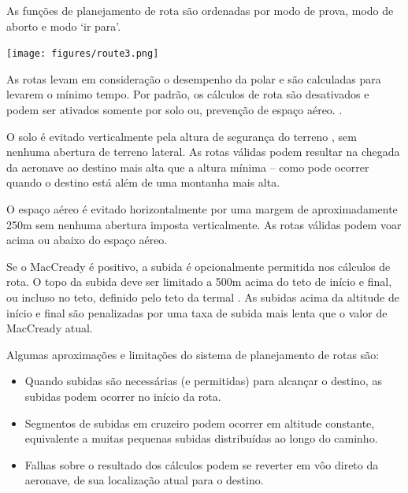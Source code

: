 As funções de planejamento de rota são ordenadas por modo de prova, modo de aborto e modo ‘ir para’.

\begin{center}
\texttt{[image: figures/route3.png]}
\end{center}

As rotas levam em consideração o desempenho da polar e são calculadas para levarem o mínimo 
tempo.  Por padrão, os cálculos de rota são desativados e podem ser ativados somente por 
solo ou, prevenção de espaço aéreo. .

O solo é evitado verticalmente pela altura de segurança do terreno
, sem nenhuma abertura de terreno lateral.  As rotas válidas podem 
resultar na chegada da aeronave ao destino mais alta que a altura mínima – como pode 
ocorrer quando o destino está além de uma montanha mais alta.

O espaço aéreo é evitado horizontalmente por uma margem de aproximadamente 250m sem 
nenhuma abertura imposta verticalmente.  As rotas válidas podem voar acima ou abaixo 
do espaço aéreo.

Se o MacCready é positivo, a subida é opcionalmente permitida nos cálculos de rota.  O 
topo da subida deve ser limitado a 500m acima do teto de início e final, ou incluso no 
teto, definido pelo teto da termal .  
As subidas acima da altitude 
de início e final são penalizadas por uma taxa de subida mais lenta que o valor de 
MacCready atual.

Algumas aproximações e limitações do sistema de planejamento de rotas são:
\begin{itemize}
\item Quando subidas são necessárias (e permitidas) para alcançar o destino, as subidas podem ocorrer no início da rota. 
\item Segmentos de subidas em cruzeiro podem ocorrer em altitude constante, equivalente a muitas pequenas subidas distribuídas ao longo do caminho. 
\item Falhas sobre o resultado dos cálculos podem se reverter em vôo direto da aeronave, de sua localização atual para o destino.
\end{itemize}

